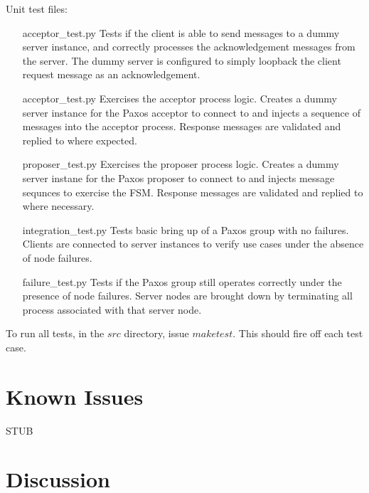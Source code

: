 \documentclass{article}
\begin{document}
Unit test files:
\begin{itemize}
\item [acceptor\_test.py] Tests if the client is able to send messages to a dummy server instance, and correctly processes the acknowledgement messages from the server. 
  The dummy server is configured to simply loopback the client request message as an acknowledgement.
\item [acceptor\_test.py] Exercises the acceptor process logic. 
  Creates a dummy server instance for the Paxos acceptor to connect to and injects a sequence of messages into the acceptor process. 
  Response messages are validated and replied to where expected.
\item [proposer\_test.py] Exercises the proposer process logic.
  Creates a dummy server instane for the Paxos proposer to connect to and injects message sequnces to exercise the FSM.
  Response messages are validated and replied to where necessary.
\item [integration\_test.py] Tests basic bring up of a Paxos group with no failures.
  Clients are connected to server instances to verify use cases under the absence of node failures.
\item [failure\_test.py] Tests if the Paxos group still operates correctly under the presence of node failures.
  Server nodes are brought down by terminating all process associated with that server node.
\end{itemize}

To run all tests, in the $src$ directory, issue $make test$.
This should fire off each test case.


\section{Known Issues}

STUB


\section{Discussion}
\end{document}
